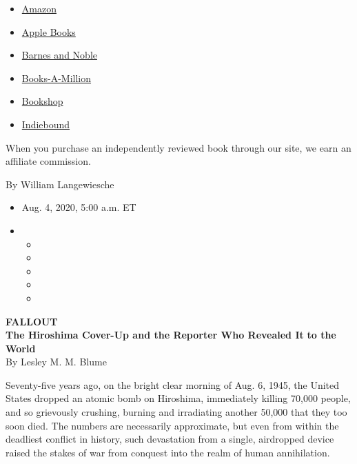 \begin{itemize}
\tightlist
\item
  \href{https://www.amazon.com/gp/search?index=books\&tag=NYTBSREV-20\&field-keywords=Fallout\%3A+The+Hiroshima+Cover-Up+and+the+Reporter+Who+Revealed+It+to+the+World+Lesley+M.M.+Blume}{Amazon}
\item
  \href{https://du-gae-books-dot-nyt-du-prd.appspot.com/buy?title=Fallout\%3A+The+Hiroshima+Cover-Up+and+the+Reporter+Who+Revealed+It+to+the+World\&author=Lesley+M.M.+Blume}{Apple
  Books}
\item
  \href{https://www.anrdoezrs.net/click-7990613-11819508?url=https\%3A\%2F\%2Fwww.barnesandnoble.com\%2Fw\%2F\%3Fean\%3D9781982128531}{Barnes
  and Noble}
\item
  \href{https://www.anrdoezrs.net/click-7990613-35140?url=https\%3A\%2F\%2Fwww.booksamillion.com\%2Fp\%2FFallout\%253A\%2BThe\%2BHiroshima\%2BCover-Up\%2Band\%2Bthe\%2BReporter\%2BWho\%2BRevealed\%2BIt\%2Bto\%2Bthe\%2BWorld\%2FLesley\%2BM.M.\%2BBlume\%2F9781982128531}{Books-A-Million}
\item
  \href{https://bookshop.org/a/3546/9781982128531}{Bookshop}
\item
  \href{https://www.indiebound.org/book/9781982128531?aff=NYT}{Indiebound}
\end{itemize}

When you purchase an independently reviewed book through our site, we
earn an affiliate commission.

By William Langewiesche

\begin{itemize}
\item
  Aug. 4, 2020, 5:00 a.m. ET
\item
  \begin{itemize}
  \item
  \item
  \item
  \item
  \item
  \end{itemize}
\end{itemize}

\textbf{FALLOUT}\\
\textbf{The Hiroshima Cover-Up and the Reporter Who Revealed It}
\textbf{to the World}\\
By Lesley M. M. Blume

Seventy-five years ago, on the bright clear morning of Aug. 6, 1945, the
United States dropped an atomic bomb on Hiroshima, immediately killing
70,000 people, and so grievously crushing, burning and irradiating
another 50,000 that they too soon died. The numbers are necessarily
approximate, but even from within the deadliest conflict in history,
such devastation from a single, airdropped device raised the stakes of
war from conquest into the realm of human annihilation.


